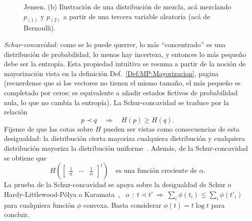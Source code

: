 \begin{propiedades}
\begin{figure}[h!]
{    Jensen.  (b) Ilustraci\'on de  una distribuci\'on de mezcla, ac\'a mezclando
    $p_{(1)}$ y $p_{(2)}$  a partir de una tercera  variable aleatoria (ac\'a de
    Bernoulli).}
  \label{Fig:SZ:Concavidad}
  \end{figure}
%
\setcounter{PropSchurConcavidad}{\value{enumi}}
\item\label{Prop:SZ:Schurconcavidad}  {\it Schur-concavidad:}  como se  lo puede
  querrer, lo  m\'as ``concentrado'' es  una distribuci\'on de  probabilidad, lo
  menos hay  incerteza, y  entonces lo m\'as  peque\~no debe ser  la entrop\'ia.
  Esta propiedad intuitiva  se resuma a partir de  la noci\'on de mayorizaci\'on
  vista       en      la       definici\'on      Def.~\ref{Def:MP:Mayorizacion},
  pagina~\pageref{Def:MP:Mayorizacion}  (recuerdense  que  si  los  vectores  no
  tienen  el mismo  tama\~no, el  m\'as peque\~no  es completado  por  ceros; es
  equivalente a a\~nadir estados fictivos de probabilidad nula, lo que no cambia
  la entrop\'ia).
  La  Schur-concavidad  se  traduce  por  la  relaci\'on
  \[
  p \prec  q \quad \Rightarrow  \quad H(p) \ge  H(q).
  \]
  Fijense de  que las cotas  sobre $H$ pueden  ser vistas como  consecuencias de
  esta desigualdad: la  distribuci\'on cierta mayoriza cualquiera distribuci\'on
  y  cualquiera distribuci\'on  mayoriza la  distribuci\'on uniforme~\cite[p.~9,
  (6)-(8)]{MarOlk11}.  Adem\'as, de la Schur-concavidad se obtiene que
  \[
  H\left( \begin{bmatrix}  \frac1\alpha & \cdots  & \frac1\alpha \end{bmatrix}^t
  \right) \quad \mbox{es una funci\'on creciente de } \alpha.
  \]
  La prueba  de la  Schur-concavidad se  apoya sobre la  desigualdad de  Schur o
  Hardy-Littlewood-P\'olya    o     Karamata~\cite{Sch23,    HarLit29,    Kar32,
    HarLit52},~\cite[Cap.~3,                                 Prop.~C.1]{MarOlk11}
  o~\cite[Teorema~II.3.1]{Bha97}: $t \prec t' \: \Rightarrow \: \sum_i \phi(t_i)
  \le  \sum_i  \phi(t'_i)$  para  cualquiera  funci\'on  $\phi$  convexa.  Basta
  considerar $\phi(t) = t \log t$ para concluir.
\end{propiedades}
%



